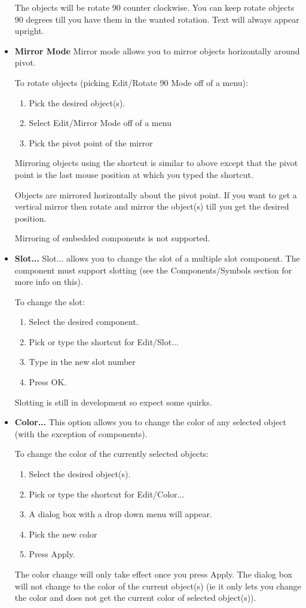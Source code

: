 \documentclass{article}
\begin{document}
\begin{itemize}
The objects will be rotate 90 counter clockwise.  You can keep rotate
objects 90 degrees till you have them in the wanted rotation.  Text
will always appear upright.
                
\item {\bf Mirror Mode} Mirror mode allows you to mirror objects
  horizontally around pivot.
  
  To rotate objects (picking Edit/Rotate 90 Mode off of a menu):
\begin{enumerate}
\item Pick the desired object(s).
\item Select Edit/Mirror Mode off of a menu
\item Pick the pivot point of the mirror
\end{enumerate}
Mirroring objects using the shortcut is similar to above except that
the pivot point is the last mouse position at which you typed the
shortcut.

Objects are mirrored horizontally about the pivot point.  If you want
to get a vertical mirror then rotate and mirror the object(s) till you
get the desired position.

Mirroring of embedded components is not supported.

\item {\bf Slot...}  Slot... allows you to change the slot of a
  multiple slot component.  The component must support slotting (see
  the Components/Symbols section for more info on this).
  
  To change the slot:
\begin{enumerate}
\item Select the desired component.
\item Pick or type the shortcut for Edit/Slot...
\item Type in the new slot number
\item Press OK.
\end{enumerate}                        
Slotting is still in development so expect some quirks.
        
\item {\bf Color...}  This option allows you to change the color of
  any selected object (with the exception of components).
  
  To change the color of the currently selected objects:
\begin{enumerate}
\item Select the desired object(s).
\item Pick or type the shortcut for Edit/Color...
\item A dialog box with a drop down menu will appear.
\item Pick the new color
\item Press Apply.
\end{enumerate}
The color change will only take effect once you press Apply.  The
dialog box will not change to the color of the current object(s) (ie
it only lets you change the color and does not get the current color
of selected object(s)).


\end{itemize}
\end{document}
